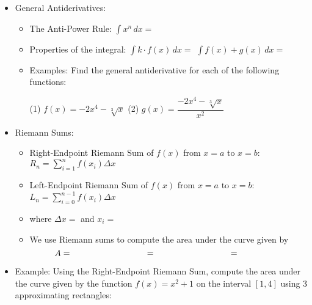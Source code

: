 \documentclass[12pt]{report}
\newcommand{\ds}{\displaystyle}
\begin{document}
\begin{itemize}

\item General Antiderivatives: %

\begin{itemize}

\item The Anti-Power Rule: $\ds\int x^n \, dx = $

\item Properties of the integral: $\ds\int k \cdot f(x)\, dx = $ \hspace{1in} $\ds\int f(x) + g(x) \, dx = $

\item Examples: Find the general antiderivative for each of the following functions:

(1) $f(x) = -2x^4 - \sqrt[3]{x}$ \hspace{2in} (2) $g(x) = \dfrac{-2x^4 - \sqrt[3]{x}}{x^2}$

\bigskip\bigskip

\end{itemize}

\item Riemann Sums: 

\begin{itemize}

\item Right-Endpoint Riemann Sum of $f(x)$ from $x= a$ to $x = b$: $R_n = \ds \sum_{i = 1}^n f(x_i) \Delta x$


\item Left-Endpoint Riemann Sum of $f(x)$ from $x= a$ to $x = b$: $L_n = \ds \sum_{i=0}^{n-1} f(x_{i}) \Delta x$

\bigskip

\item[] where $\Delta x = $  \hspace{2in} and  $x_i = $ 

\bigskip

\item We use Riemann sums to compute the area under the curve given by $$\hspace{-0.75in} A = \hspace{1.25in} = \hspace{1.25in} =$$

\end{itemize}


\item Example: Using the Right-Endpoint Riemann Sum, compute the area under the curve given by the function $f(x) = x^2 + 1$ on the interval $[1,4]$ using 3 approximating rectangles: 


\end{itemize}
\end{document}
